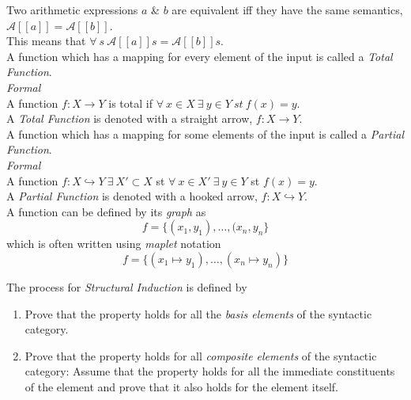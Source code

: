 \documentclass[11pt,a4paper]{article}
\begin{document}
Two arithmetic expressions $a$ \& $b$ are equivalent iff they have the same semantics, $\mathcal{A}[[a]]=\mathcal{A}[[b]]$.\\
This means that $\forall\ s\ \mathcal{A}[[a]]s=\mathcal{A}[[b]]s$.\\

A function which has a mapping for every element of the input is called a \textit{Total Function}.\\
\textit{Formal}\\
A function $f:X\to Y$ is total if $\forall\ x\in X\ \exists\ y\in Y\ st\ f(x)=y$.\\
\nb A \textit{Total Function} is denoted with a straight arrow, $f:X\to Y$.\\

A function which has a mapping for some elements of the input is called a \textit{Partial Function}.\\
\textit{Formal}\\
A function $f:X\hookrightarrow Y\ \exists\ X'\subset X$ st $\forall\ x\in X'\ \exists\ y\in Y$ st $f(x)=y$.\\
\nb A \textit{Partial Function} is denoted with a hooked arrow, $f:X\hookrightarrow Y$.\\

A function can be defined by its \textit{graph} as
$$f=\{(x_1,y_1),\dots,(x_n,y_n\}$$
which is often written using \textit{maplet} notation
$$f=\{(x_1\mapsto y_1),\dots,(x_n\mapsto y_n)\}$$

The process for \textit{Structural Induction} is defined by
\begin{enumerate}[label=\roman*)]
	\item Prove that the property holds for all the \textit{basis elements} of the syntactic category.
	\item Prove that the property holds for all \textit{composite elements} of the syntactic category: Assume that the property holds for all the immediate constituents of the element and prove that it also holds for the element itself.
\end{enumerate}
\end{document}
